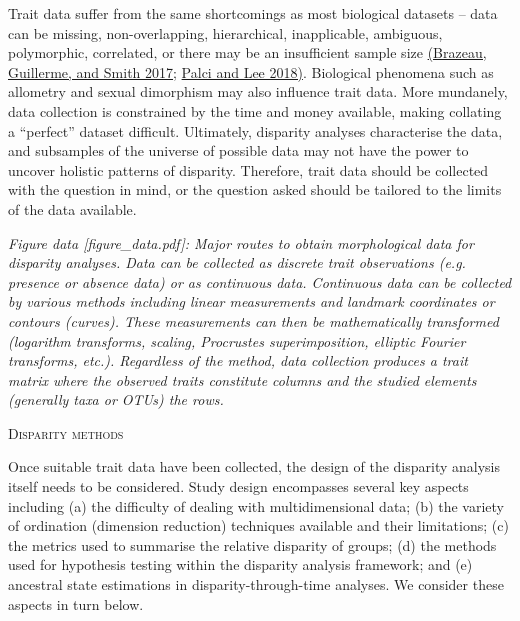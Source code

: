 \documentclass[12pt,letterpaper]{article}
\renewcommand{\section}[1]{%
\bigskip
\begin{center}
\begin{Large}
\normalfont\scshape #1
\medskip
\end{Large}
\end{center}}
\begin{document}
Trait data suffer from the same shortcomings as most biological datasets -- data can be missing, non-overlapping, hierarchical, inapplicable, ambiguous, polymorphic, correlated, or there may be an insufficient sample size \href{https://paperpile.com/c/sTGYvp/Yrbg}{(Brazeau, Guillerme, and Smith 2017}; \href{https://paperpile.com/c/sTGYvp/yO2t}{Palci and Lee 2018)}.
Biological phenomena such as allometry and sexual dimorphism may also influence trait data.
More mundanely, data collection is constrained by the time and money available, making collating a ``perfect'' dataset difficult.
Ultimately, disparity analyses characterise the data, and subsamples of the universe of possible data may not have the power to uncover holistic patterns of disparity.
Therefore, trait data should be collected with the question in mind, or the question asked should be tailored to the limits of the data available.


\emph{Figure data {[}figure\_data.pdf{]}: Major routes to obtain morphological data for disparity analyses. Data can be collected as discrete trait observations (e.g. presence or absence data) or as continuous data.
Continuous data can be collected by various methods including linear measurements and landmark coordinates or contours (curves).
These measurements can then be mathematically transformed (logarithm transforms, scaling, Procrustes superimposition, elliptic Fourier transforms, etc.).
Regardless of the method, data collection produces a trait matrix where the observed traits constitute columns and the studied elements (generally taxa or OTUs) the rows.}

\hypertarget{disparity-methods}{%
\section{Disparity methods}\label{disparity-methods}}

Once suitable trait data have been collected, the design of the disparity analysis itself needs to be considered.
Study design encompasses several key aspects including (a) the difficulty of dealing with multidimensional data; (b) the variety of ordination (dimension reduction) techniques available and their limitations; (c) the metrics used to summarise the relative disparity of groups; (d) the methods used for hypothesis testing within the disparity analysis framework; and (e) ancestral state estimations in disparity-through-time analyses.
We consider these aspects in turn below.
\end{document}

